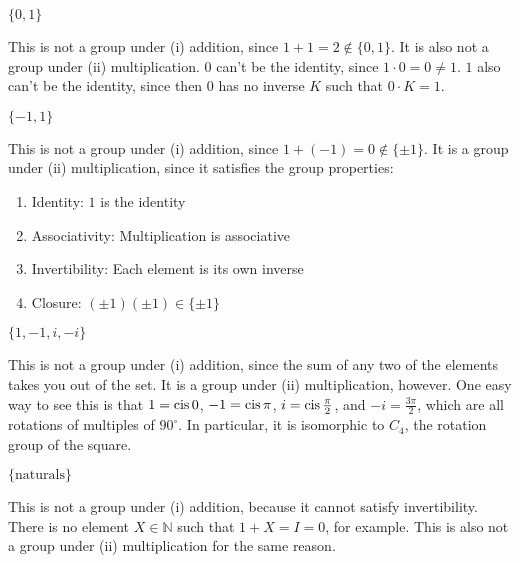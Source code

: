 \documentclass[../key.tex]{subfiles}
\begin{document}
\begin{inner_problem}
\item $\{0,1\}$
\end{inner_problem}

This is not a group under (i) addition, since $1+1=2\not\in \{0,1\}$. It is also not a group under (ii) multiplication. $0$ can't be the identity, since $1\cdot 0=0\neq 1$. $1$ also can't be the identity, since then $0$ has no inverse $K$ such that $0\cdot K = 1$.

\begin{inner_problem}
\item $\{-1,1\}$
\end{inner_problem}

This is not a group under (i) addition, since $1+(-1)=0\not\in\{\pm 1\}$. It is a group under (ii) multiplication, since it satisfies the group properties:

\begin{enumerate}
    \item Identity: $1$ is the identity
    \item Associativity: Multiplication is associative
    \item Invertibility: Each element is its own inverse
    \item Closure: $(\pm 1)(\pm 1) \in \{ \pm 1 \}$
\end{enumerate}

\begin{inner_problem}
\item $\{1, -1, i, -i\}$
\end{inner_problem}

This is not a group under (i) addition, since the sum of any two of the elements takes you out of the set. It is a group under (ii) multiplication, however. One easy way to see this is that $1=\operatorname{cis} 0$, $-1 = \operatorname{cis} \pi$, $i=\operatorname{cis} \frac{\pi}{2}$, and $-i=\frac{3\pi}{2}$, which are all rotations of multiples of $90^\circ$. In particular, it is isomorphic to $C_4$, the rotation group of the square.

\begin{inner_problem}
\item $\{\text{naturals}\}$
\end{inner_problem}

This is not a group under (i) addition, because it cannot satisfy invertibility. There is no element $X\in \mathbb{N}$ such that $1+X=I=0$, for example. This is also not a group under (ii) multiplication for the same reason.
\end{document}
